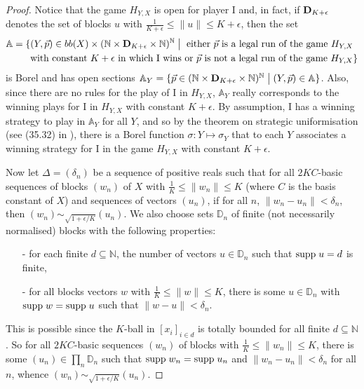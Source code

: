 \documentclass[10pt]{amsart}
\numberwithin{equation}{section}
\begin{document}
\begin{proof}
Notice that the game $H_{Y,X}$ is open for player I and, in fact, if ${\bf
D}_{K+\epsilon}$ denotes the set of blocks $u$ with $\frac1{K+\epsilon}{\ensuremath{\leqslant}}
{\lVert{u}\rVert}{\ensuremath{\leqslant}} K+\epsilon$, then the set
\begin{displaymath}\begin{split}
{\mathbb A}=\{&(Y,\vec p)\in bb(X)\times ({\mathbb N}\times {\bf D}_{K+\epsilon}\times {\mathbb N})^{\mathbb N}{ \; \big| \;}
\textrm{ either $\vec p$ is a legal run of the game } H_{Y,X}\\
&\textrm{with constant $K+\epsilon$ in which I wins or $\vec p$ is not a legal run of the game } H_{Y,X}\}
\end{split}\end{displaymath}
is Borel and has open sections ${\mathbb A}_Y=\{\vec p\in ({\mathbb N}\times {\bf
D}_{K+\epsilon}\times {\mathbb N})^{\mathbb N}{ \; \big| \;} (Y,\vec p)\in {\mathbb A}\}$. Also, since there are no
rules for the play of I in $H_{Y,X}$, ${\mathbb A}_Y$ really corresponds to the winning
plays for I in $H_{Y,X}$ with constant $K+\epsilon$. By assumption, I has a
winning strategy to play in ${\mathbb A}_Y$ for all $Y$, and so by the theorem on
strategic uniformisation (see (35.32) in \cite{kechris}), there is a Borel
function $\sigma\colon Y\mapsto \sigma_Y$ that to each $Y$ associates a winning
strategy for I in the game $H_{Y, X}$ with constant $K+\epsilon$.

Now let $\Delta=(\delta_n)$ be a sequence of positive reals such that for all
$2KC$-basic sequences of  blocks $(w_n)$ of $X$ with $\frac1{K}{\ensuremath{\leqslant}}
{\lVert{w_n}\rVert}{\ensuremath{\leqslant}} K$ (where $C$ is the basis constant of $X$) and sequences of
vectors $(u_n)$, if for all $n$, ${\lVert{w_n-u_n}\rVert}<\delta_n$, then
$(w_n)\sim_{\sqrt{1+\epsilon/K}}(u_n)$. We also choose sets ${\mathbb D}_n$ of finite
(not necessarily normalised) blocks with the following properties:
\begin{itemize}
  \item [-] for each finite $d\subseteq {\mathbb N}$, the number of vectors $u\in {\mathbb D}_n$ such that ${\rm supp}\; u=d$ is finite,
  \item [-] for all blocks vectors $w$ with $\frac1{K}{\ensuremath{\leqslant}} {\lVert{w}\rVert}{\ensuremath{\leqslant}} K$, there is
  some $u\in {\mathbb D}_n$ with ${\rm supp} \;w={\rm supp}\; u$ such that
  ${\lVert{w-u}\rVert}<\delta_n$.
\end{itemize}
This is possible since the $K$-ball in $[x_i]_{i\in d}$ is totally bounded for
all finite $d\subseteq{\mathbb N}$. So for all $2KC$-basic sequences $(w_n)$ of blocks
with $\frac1K{\ensuremath{\leqslant}} {\lVert{w_n}\rVert}{\ensuremath{\leqslant}} K$, there is some $(u_n)\in \prod_n{\mathbb D}_n$ such
that ${\rm supp}\; w_n={\rm supp}\; u_n$ and ${\lVert{w_n-u_n}\rVert}<\delta_n$ for all
$n$, whence $(w_n)\sim_{\sqrt{1+\epsilon/K}}(u_n)$.


\end{proof}
\end{document}
